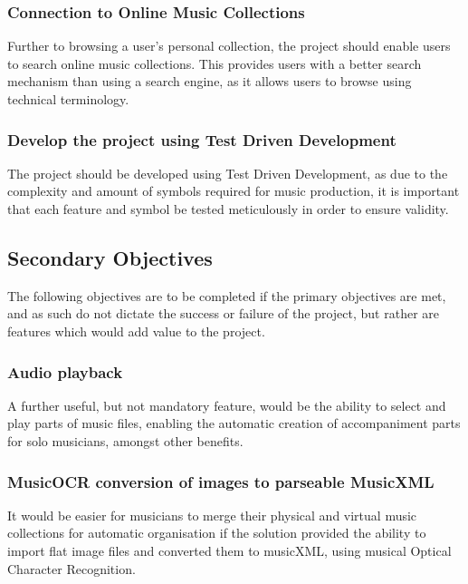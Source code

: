 \subsubsection{Connection to Online Music Collections}
Further to browsing a user's personal collection, the project should enable users to search online music collections. This provides users with a better search mechanism than using a search engine, as it allows users to browse using technical terminology.
\subsubsection{Develop the project using Test Driven Development}
The project should be developed using Test Driven Development, as due to the complexity and amount of symbols required for music production, it is important that each feature and symbol be tested meticulously in order to ensure validity.
\subsection{Secondary Objectives}
The following objectives are to be completed if the primary objectives are met, and as such do not dictate the success or failure of the project, but rather are features which would add value to the project.
\subsubsection{Audio playback}
A further useful, but not mandatory feature, would be the ability to select and play parts of music files, enabling the automatic creation of accompaniment parts for solo musicians, amongst other benefits.
\subsubsection{MusicOCR conversion of images to parseable MusicXML}
It would be easier for musicians to merge their physical and virtual music collections for automatic organisation if the solution provided the ability to import flat image files and converted them to musicXML, using musical Optical Character Recognition. 